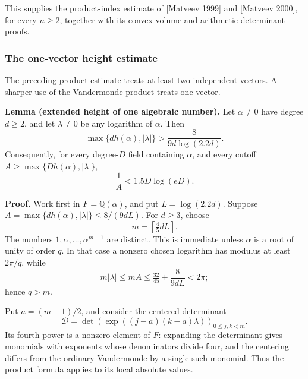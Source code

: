 \documentclass[
  11pt,
  a4paper,
]{article}
\begin{document}
This supplies the product-index estimate of {[}Matveev 1999{]} and
{[}Matveev 2000{]}, for every \(n\ge2\), together with its convex-volume
and arithmetic determinant proofs.

\subsubsection{The one-vector height
estimate}\label{the-one-vector-height-estimate}

The preceding product estimate treats at least two independent vectors.
A sharper use of the Vandermonde product treats one vector.

\textbf{Lemma (extended height of one algebraic number).} Let
\(\alpha\ne0\) have degree \(d\ge2\), and let \(\lambda\ne0\) be any
logarithm of \(\alpha\). Then \[
\max\{d h(\alpha),|\lambda|\}>
\frac8{9d\log(2.2d)}.
\tag{8.23}
\] Consequently, for every degree-\(D\) field containing \(\alpha\), and
every cutoff \(A\ge\max\{D h(\alpha),|\lambda|\}\), \[
\frac1A<1.5D\log(eD).
\tag{8.24}
\]

\textbf{Proof.} Work first in \(F=\mathbb Q(\alpha)\), and put
\(L=\log(2.2d)\). Suppose \(A=\max\{d h(\alpha),|\lambda|\}\le8/(9dL)\).
For \(d\ge3\), choose \[
m=\left\lceil\tfrac45 dL\right\rceil.
\] The numbers \(1,\alpha,\ldots,\alpha^{m-1}\) are distinct. This is
immediate unless \(\alpha\) is a root of unity of order \(q\). In that
case a nonzero chosen logarithm has modulus at least \(2\pi/q\), while
\[
m|\lambda|\le mA\le\tfrac{32}{45}+\frac8{9dL}<2\pi;
\] hence \(q>m\).

Put \(a=(m-1)/2\), and consider the centered determinant \[
\mathcal D=\det(\exp((j-a)(k-a)\lambda))_{0\le j,k<m}.
\] Its fourth power is a nonzero element of \(F\): expanding the
determinant gives monomials with exponents whose denominators divide
four, and the centering differs from the ordinary Vandermonde by a
single such monomial. Thus the product formula applies to its local
absolute values.
\end{document}
